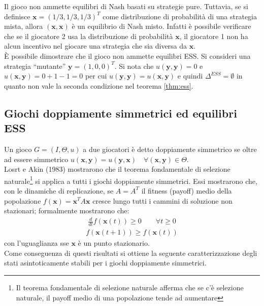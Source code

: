Il gioco non ammette equilibri di Nash basati su strategie pure. Tuttavia, se si definisce $\mathbf{x}=(1/3, 1/3, 1/3)^T$ come distribuzione di probabilità di una strategia mista, allora $(\mathbf{x}, \mathbf{x})$ è un equilibrio di Nash misto. Infatti è possibile verificare che se il giocatore 2 usa la distribuzione di probabilità $\mathbf{x}$, il giocatore 1 non ha alcun incentivo nel giocare una strategia che sia diversa da $\mathbf{x}$. \\

È possibile dimostrare che il gioco non ammette equilibri ESS. Si consideri una strategia “mutante” $\mathbf{y} = (1, 0, 0)^T$. Si nota che $u(\mathbf{y},\mathbf{y}) = 0$ e $u(\mathbf{x}, \mathbf{y}) = 0 + 1 - 1 = 0$ per cui $u(\mathbf{y}, \mathbf{y}) = u(\mathbf{x}, \mathbf{y})$ e quindi $\Delta^{ESS} = \emptyset$ in quanto non vale la seconda condizione nel teorema \ref{thm:ess}.

\subsection{Giochi doppiamente simmetrici ed equilibri ESS} %
\label{sub:giochi_doppiamente_simmetrici_ed_equilibri_ess}

Un gioco $G= (I, \Theta, u)$ a due giocatori è detto doppiamente simmetrico se oltre ad essere simmetrico $u(\mathbf{x}, \mathbf{y}) = u(\mathbf{y}, \mathbf{x}) \quad \forall(\mathbf{x}, \mathbf{y}) \in \Theta$.\\

Losrt e Akin (1983) mostrarono che il teorema fondamentale di selezione naturale\footnote{Il teorema fondamentale di selezione naturale afferma che se c'è selezione naturale, il payoff medio di una popolazione tende ad aumentare} si applica a tutti i giochi doppiamente simmetrici. Essi mostrarono che, con le dinamiche di replicazione, se $A = A^T$ il fitness (payoff) medio della popolazione  $f(\mathbf{x}) = \mathbf{x}^T A \mathbf{x}$  cresce lungo tutti i cammini di soluzione non stazionari; formalmente mostrarono che:
\begin{align*}
    \frac{d}{dt} f(\mathbf{x}(t)) \geq 0 \qquad \forall t \geq 0 \tag{Caso continuo}
\end{align*}
\begin{align*}
	f(\mathbf{x}(t + 1)) \geq f(\mathbf{x}(t)) \tag{Caso discreto}
\end{align*}
con l’uguaglianza sse $\mathbf{x}$ è un punto stazionario.\\
Come conseguenza di questi risultati si ottiene la seguente caratterizzazione degli stati asintoticamente stabili per i giochi doppiamente simmetrici.

